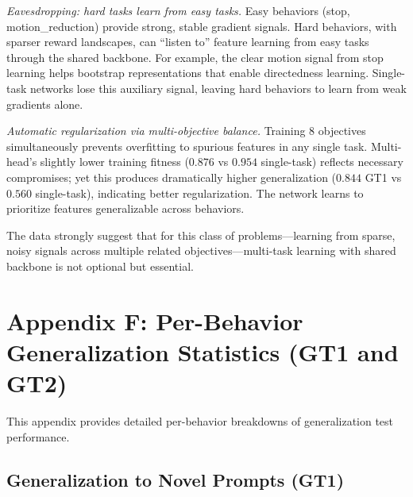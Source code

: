 \documentclass{article}
\begin{document}
\textit{Eavesdropping: hard tasks learn from easy tasks.} Easy behaviors (stop, motion\_reduction) provide strong, stable gradient signals. Hard behaviors, with sparser reward landscapes, can ``listen to'' feature learning from easy tasks through the shared backbone. For example, the clear motion signal from stop learning helps bootstrap representations that enable directedness learning. Single-task networks lose this auxiliary signal, leaving hard behaviors to learn from weak gradients alone.

\textit{Automatic regularization via multi-objective balance.} Training 8 objectives simultaneously prevents overfitting to spurious features in any single task. Multi-head's slightly lower training fitness ($0.876$ vs $0.954$ single-task) reflects necessary compromises; yet this produces dramatically higher generalization ($0.844$ GT1 vs $0.560$ single-task), indicating better regularization. The network learns to prioritize features generalizable across behaviors.

The data strongly suggest that for this class of problems---learning from sparse, noisy signals across multiple related objectives---multi-task learning with shared backbone is not optional but essential.

\section*{Appendix F: Per-Behavior Generalization Statistics (GT1 and GT2)}
\label{app:per_behavior_stats}

This appendix provides detailed per-behavior breakdowns of generalization test performance.

\subsection{Generalization to Novel Prompts (GT1)}
\end{document}
